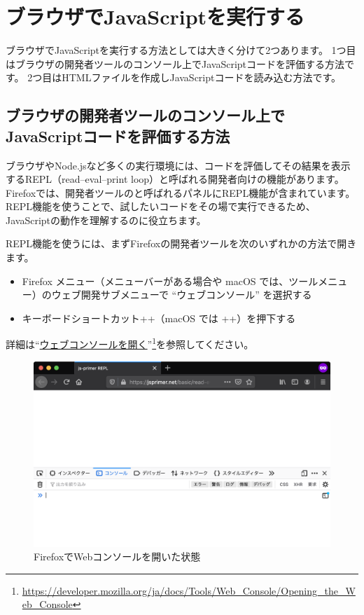 \hypertarget{execute-js-on-browser}{%
\section{ブラウザでJavaScriptを実行する}\label{execute-js-on-browser}}

ブラウザでJavaScriptを実行する方法としては大きく分けて2つあります。
1つ目はブラウザの開発者ツールのコンソール上でJavaScriptコードを評価する方法です。
2つ目はHTMLファイルを作成しJavaScriptコードを読み込む方法です。

\hypertarget{repl-on-browser}{%
\subsection{ブラウザの開発者ツールのコンソール上でJavaScriptコードを評価する方法}\label{repl-on-browser}}

ブラウザやNode.jsなど多くの実行環境には、コードを評価してその結果を表示するREPL（read--eval--print
loop）と呼ばれる開発者向けの機能があります。
Firefoxでは、開発者ツールの\textbf{}と呼ばれるパネルにREPL機能が含まれています。
REPL機能を使うことで、試したいコードをその場で実行できるため、JavaScriptの動作を理解するのに役立ちます。

REPL機能を使うには、まずFirefoxの開発者ツールを次のいずれかの方法で開きます。

\begin{itemize}
\item
  Firefox メニュー（メニューバーがある場合や macOS
  では、ツールメニュー）のウェブ開発サブメニューで ``ウェブコンソール''
  を選択する
\item
  キーボードショートカット++（macOS では
  ++）を押下する
\end{itemize}

詳細は``\href{https://developer.mozilla.org/ja/docs/Tools/Web_Console/Opening_the_Web_Console}{ウェブコンソールを開く}''\footnote{\url{https://developer.mozilla.org/ja/docs/Tools/Web_Console/Opening_the_Web_Console}}を参照してください。

\begin{figure}
\centering
\includegraphics[width=140mm]{./fig/web-console.png}
\caption{FirefoxでWebコンソールを開いた状態}
\end{figure}

